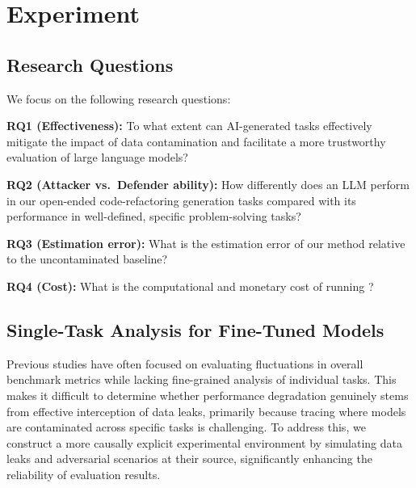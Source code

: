 \section{Experiment}
\label{sec:experiment}

\subsection{Research Questions}

We focus on the following research questions:

\textbf{RQ1 (Effectiveness):} To what extent can AI-generated tasks effectively mitigate the impact of data contamination and facilitate a more trustworthy evaluation of large language models?

\textbf{RQ2 (Attacker vs.~Defender ability):} How differently does an LLM perform in our open-ended code-refactoring generation tasks compared with its performance in well-defined, specific problem-solving tasks?

\textbf{RQ3 (Estimation error):} What is the estimation error of our method relative to the uncontaminated baseline?

\textbf{RQ4 (Cost):} What is the computational and monetary cost of running \tool{}?

\subsection{Single-Task Analysis for Fine-Tuned Models}

Previous studies have often focused on evaluating fluctuations in overall benchmark metrics while lacking fine-grained analysis of individual tasks. This makes it difficult to determine whether performance degradation genuinely stems from effective interception of data leaks, primarily because tracing where models are contaminated across specific tasks is challenging. To address this, we construct a more causally explicit experimental environment by simulating data leaks and adversarial scenarios at their source, significantly enhancing the reliability of evaluation results.

\begin{table}[th!]
\centering
\caption{Comparison between \tool{} and other contamination-detection approaches.}
\label{table3}
\end{table}

